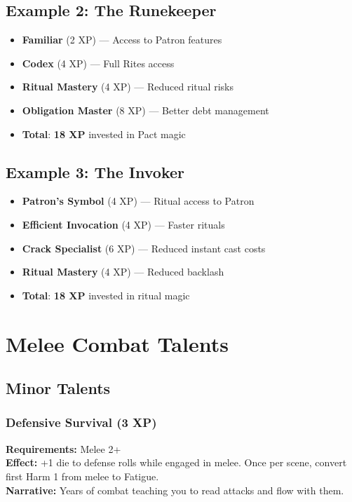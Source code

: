 \subsection*{Example 2: The Runekeeper}
\begin{itemize}
\item \textbf{Familiar} (2 XP) --- Access to Patron features
\item \textbf{Codex} (4 XP) --- Full Rites access
\item \textbf{Ritual Mastery} (4 XP) --- Reduced ritual risks
\item \textbf{Obligation Master} (8 XP) --- Better debt management
\item \textbf{Total}: \textbf{18 XP} invested in Pact magic
\end{itemize}

\subsection*{Example 3: The Invoker}
\begin{itemize}
\item \textbf{Patron's Symbol} (4 XP) --- Ritual access to Patron
\item \textbf{Efficient Invocation} (4 XP) --- Faster rituals
\item \textbf{Crack Specialist} (6 XP) --- Reduced instant cast costs
\item \textbf{Ritual Mastery} (4 XP) --- Reduced backlash
\item \textbf{Total}: \textbf{18 XP} invested in ritual magic
\end{itemize}

\section{Melee Combat Talents}

\subsection{Minor Talents}

\subsubsection{Defensive Survival (3 XP)}
\textbf{Requirements:} Melee 2+ \\
\textbf{Effect:} +1 die to defense rolls while engaged in melee. Once per scene, convert first Harm 1 from melee to Fatigue. \\
\textbf{Narrative:} Years of combat teaching you to read attacks and flow with them.

